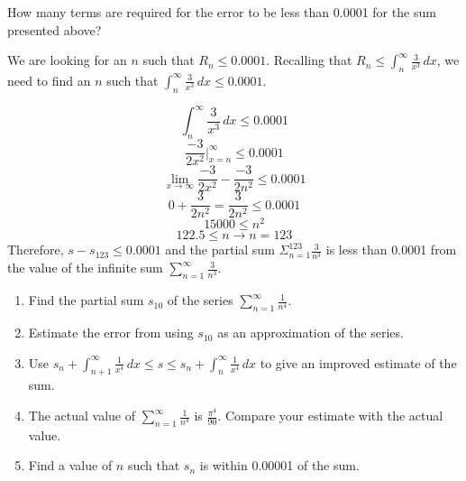 \begin{Worked}
\begin{Problem}
How many terms are required for the error to be less than 
0.0001 for the sum presented above?
\end{Problem}
\begin{Solution}
We are looking for an $n$ such that $R_n \leq 0.0001$. 
Recalling that $R_n \leq \int_{n}^\infty \frac{3}{x^3}\,dx$, we need to find 
an $n$ such that $\int_{n}^\infty \frac{3}{x^3}\,dx \leq 0.0001$. 

$$\int_n^\infty \frac{3}{x^3}\,dx \leq 0.0001$$
$$\frac{-3}{2x^2}|_{x=n}^\infty \leq 0.0001$$
$$\lim_{x \to \infty} \frac{-3}{2x^2} - \frac{-3}{2n^2} \leq 0.0001$$
$$0 + \frac{3}{2n^2} = \frac{3}{2n^2} \leq 0.0001$$
$$15000 \leq n^2$$
$$122.5 \leq n \rightarrow n = 123$$
Therefore, $s - s_{123} \leq 0.0001$ and the partial sum $\Sigma_{n=1}^{123} 
\frac{3}{n^3}$ is less than 0.0001 from the value of the infinite sum $\sum_
{n=1}^\infty \frac{3}{n^3}$.
\end{Solution}
\end{Worked}

\begin{Exercise}[label=remainder1]
\begin{enumerate}
\item Find the partial sum $s_{10}$ of the series $\sum_{n=1}^\infty 
\frac{1}{n^4}$. 
\item Estimate the error from using $s_{10}$ as an approximation of the series.
\item Use $s_n + \int_{n+1}^\infty \frac{1}{x^4}\,dx \leq s \leq s_n + \int_n^
\infty \frac{1}{x^4}\,dx$ to give an improved estimate of the sum.
\item The actual value of $\sum_{n=1}^\infty \frac{1}{n^4}$ is 
$\frac{\pi^4}{90}$. Compare your estimate with the actual value.
\item Find a value of $n$ such that $s_n$ is within 0.00001 of the sum. 
\end{enumerate}
\vspace{50mm}
\end{Exercise}

